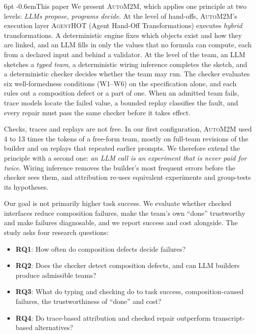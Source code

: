 \documentclass[pdflatex,sn-mathphys-num]{sn-jnl}
\makeatletter
\theoremstyle{thmstyleone}%
\theoremstyle{thmstyletwo}%
\theoremstyle{thmstylethree}%
\newcommand{\tool}{\textsc{AgentHOT}}
\newcommand{\auto}{\textsc{AutoM2M}}
\newcommand{\W}[1]{\textsf{W#1}}
\newcommand{\RQ}[1]{\textbf{RQ#1}}
\renewcommand\paragraph{\@startsection{paragraph}{4}{\z@}%
  {6pt \@plus 2pt \@minus 1pt}{-0.6em}{\normalfont\normalsize\bfseries}}
\makeatother
\begin{document}
\paragraph{This paper} We present \auto{}, which applies one principle at two
levels: \emph{LLMs propose, programs decide}. At the level of hand-offs,
\auto{}'s execution layer \tool{} (Agent Hand-Off Transformations) executes
\emph{hybrid} transformations. A deterministic engine fixes which objects exist
and how they are linked, and an LLM fills in only the values that no formula
can compute, each from a declared input and behind a validator. At the level of
the team, an LLM sketches a \emph{typed team}, a deterministic wiring inference
completes the sketch, and a deterministic checker decides whether the team may
run. The checker evaluates six well-formedness conditions (\W{1}--\W{6}) on the
specification alone, and each rules out a composition defect or a part of one.
When an admitted team fails, trace models locate the failed value, a bounded
replay classifies the fault, and every repair must pass the same checker before
it takes effect.

Checks, traces and replays are not free. In our first configuration, \auto{}
used 4 to 13 times the tokens of a free-form team, mostly on full-team
revisions of the builder and on replays that repeated earlier prompts. We
therefore extend the principle with a second one: \emph{an LLM call is an
experiment that is never paid for twice}. Wiring inference removes the
builder's most frequent errors before the checker sees them, and attribution
re-uses equivalent experiments and group-tests its hypotheses.

Our goal is not primarily higher task success. We evaluate whether checked
interfaces reduce composition failures, make the team's own ``done''
trustworthy and make failures diagnosable, and we report success and cost
alongside. The study asks four research questions:
\begin{itemize}[leftmargin=1.4em, itemsep=1pt]
\item \RQ{1}: How often do composition defects decide failures?
\item \RQ{2}: Does the checker detect composition defects, and can LLM builders
produce admissible teams?
\item \RQ{3}: What do typing and checking do to task success, composition-caused
failures, the trustworthiness of ``done'' and cost?
\item \RQ{4}: Do trace-based attribution and checked repair outperform
transcript-based alternatives?
\end{itemize}
\end{document}

